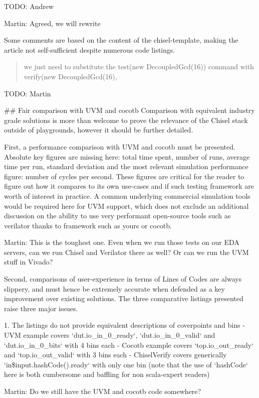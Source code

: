 \documentclass{article}
\newcommand{\todo}[1]{{\color{olive} TODO: #1}}
\newcommand{\martin}[1]{{\color{blue} Martin: #1\\}}
\begin{document}
\todo{Andrew}

\martin{Agreed, we will rewrite}

Some comments are based on the content of the chisel-template, making the article not self-sufficient despite numerous code listings.
\begin{quote}
we just need to substitute the test(new DecoupledGcd(16)) command with verify(new DecoupledGcd(16),
\end{quote}

\todo{Martin}


\#\# Fair comparison with UVM and cocotb
Comparison with equivalent industry grade solutions is more than welcome to prove the relevance of the Chisel stack outside of playgrounds, however it should be further detailed.

First, a performance comparison with UVM and cocotb must be presented.
Absolute key figures are missing here: total time spent, number of runs, average time per run, standard deviation and the most relevant simulation performance figure: number of cycles per second.
These figures are critical for the reader to figure out how it compares to its own use-cases and if such testing framework are worth of interest in practice.
A common underlying commercial simulation tools would be required here for UVM support, which does not exclude an additional discussion on the ability to use very performant open-source tools such as verilator thanks to framework such as yours or cocotb.

\martin{This is the toughest one. Even when we run those tests on our EDA servers, can we run
Chisel and Verilator there as well? Or can we run the UVM stuff in Vivado?}

Second, comparisons of user-experience in terms of Lines of Codes are always slippery, and must hence be extremely accurate when defended as a key improvement over existing solutions.
The three comparative listings presented raise three major issues.

1. The listings do not provide equivalent descriptions of coverpoints and bins
- UVM example covers `dut.io\_in\_0\_ready`, `dut.io\_in\_0\_valid` and `dut.io\_in\_0\_bits` with 4 bins each
- Cocotb example covers `top.io\_out\_ready` and `top.io\_out\_valid` with 3 bins each
- ChiselVerify covers generically `in\${input.hashCode()}.ready` with only one bin (note that the use of `hashCode` here is both cumbersome and baffling for non scala-expert readers)

\martin{Do we still have the UVM and cocotb code somewhere?}
\end{document}
